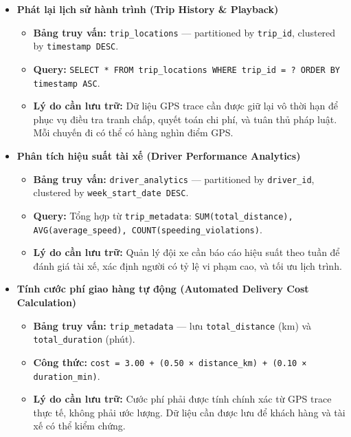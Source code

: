 \begin{itemize}

\item \textbf{Phát lại lịch sử hành trình (Trip History \& Playback)}
\begin{itemize}
    \item \textbf{Bảng truy vấn:} \texttt{trip\_locations} — partitioned by \texttt{trip\_id}, clustered by \texttt{timestamp DESC}.
    \item \textbf{Query:} \texttt{SELECT * FROM trip\_locations WHERE trip\_id = ? ORDER BY timestamp ASC}.
    \item \textbf{Lý do cần lưu trữ:} Dữ liệu GPS trace cần được giữ lại vô thời hạn để phục vụ điều tra tranh chấp, quyết toán chi phí, và tuân thủ pháp luật. Mỗi chuyến đi có thể có hàng nghìn điểm GPS.
\end{itemize}

\item \textbf{Phân tích hiệu suất tài xế (Driver Performance Analytics)}
\begin{itemize}
    \item \textbf{Bảng truy vấn:} \texttt{driver\_analytics} — partitioned by \texttt{driver\_id}, clustered by \texttt{week\_start\_date DESC}.
    \item \textbf{Query:} Tổng hợp từ \texttt{trip\_metadata}: \texttt{SUM(total\_distance), AVG(average\_speed), COUNT(speeding\_violations)}.
    \item \textbf{Lý do cần lưu trữ:} Quản lý đội xe cần báo cáo hiệu suất theo tuần để đánh giá tài xế, xác định người có tỷ lệ vi phạm cao, và tối ưu lịch trình.
\end{itemize}

\item \textbf{Tính cước phí giao hàng tự động (Automated Delivery Cost Calculation)}
\begin{itemize}
    \item \textbf{Bảng truy vấn:} \texttt{trip\_metadata} — lưu \texttt{total\_distance} (km) và \texttt{total\_duration} (phút).
    \item \textbf{Công thức:} \texttt{cost = 3.00 + (0.50 × distance\_km) + (0.10 × duration\_min)}.
    \item \textbf{Lý do cần lưu trữ:} Cước phí phải được tính chính xác từ GPS trace thực tế, không phải ước lượng. Dữ liệu cần được lưu để khách hàng và tài xế có thể kiểm chứng.
\end{itemize}


\end{itemize}

